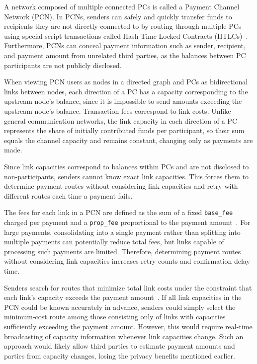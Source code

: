 \documentclass[conference]{IEEEtran}
\begin{document}
A network composed of multiple connected PCs is called a Payment Channel Network (PCN). In PCNs, senders can safely and quickly transfer funds to recipients they are not directly connected to by routing through multiple PCs using special script transactions called Hash Time Locked Contracts (HTLCs)~\cite{poon_dryja_2016}. Furthermore, PCNs can conceal payment information such as sender, recipient, and payment amount from unrelated third parties, as the balances between PC participants are not publicly disclosed.

When viewing PCN users as nodes in a directed graph and PCs as bidirectional links between nodes, each direction of a PC has a capacity corresponding to the upstream node's balance, since it is impossible to send amounts exceeding the upstream node's balance. Transaction fees correspond to link costs. Unlike general communication networks, the link capacity in each direction of a PC represents the share of initially contributed funds per participant, so their sum equals the channel capacity and remains constant, changing only as payments are made.

Since link capacities correspond to balances within PCs and are not disclosed to non-participants, senders cannot know exact link capacities. This forces them to determine payment routes without considering link capacities and retry with different routes each time a payment fails.

The fees for each link in a PCN are defined as the sum of a fixed \texttt{base\_fee} charged per payment and a \texttt{prop\_fee} proportional to the payment amount~\cite{lnbolt}. For large payments, consolidating into a single payment rather than splitting into multiple payments can potentially reduce total fees, but links capable of processing such payments are limited. Therefore, determining payment routes without considering link capacities increases retry counts and confirmation delay time.

Senders search for routes that minimize total link costs under the constraint that each link's capacity exceeds the payment amount~\cite{lnd,clightning,eclair}. If all link capacities in the PCN could be known accurately in advance, senders could simply select the minimum-cost route among those consisting only of links with capacities sufficiently exceeding the payment amount. However, this would require real-time broadcasting of capacity information whenever link capacities change. Such an approach would likely allow third parties to estimate payment amounts and parties from capacity changes, losing the privacy benefits mentioned earlier.
\end{document}
